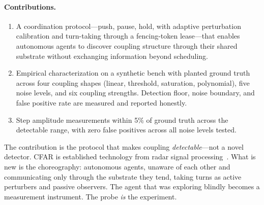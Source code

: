 \paragraph{Contributions.}
\begin{enumerate}
  \item A coordination protocol---push, pause, hold, with adaptive
    perturbation calibration and turn-taking through a fencing-token
    lease---that enables autonomous agents to discover coupling
    structure through their shared substrate without exchanging
    information beyond scheduling.
  \item Empirical characterization on a synthetic bench with planted
    ground truth across four coupling shapes (linear, threshold,
    saturation, polynomial), five noise levels, and six coupling
    strengths. Detection floor, noise boundary, and false positive
    rate are measured and reported honestly.
  \item Step amplitude measurements within 5\% of ground truth across
    the detectable range, with zero false positives across all noise
    levels tested.
\end{enumerate}

The contribution is the protocol that makes coupling
\emph{detectable}---not a novel detector. CFAR is established
technology from radar signal processing~\citep{finn1968cfar}. What
is new is the choreography: autonomous agents, unaware of each other
and communicating only through the substrate they tend, taking turns
as active perturbers and passive observers. The agent that was
exploring blindly becomes a measurement instrument. The probe
\emph{is} the experiment.
